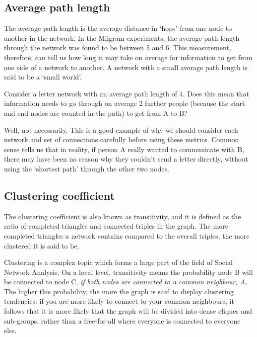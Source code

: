 \documentclass[
]{book}
\begin{document}
\hypertarget{average-path-length}{%
\subsection{Average path length}\label{average-path-length}}

The average path length is the average distance in `hops' from one node to another in the network. In the Milgram experiments, the average path length through the network was found to be between 5 and 6. This measurement, therefore, can tell us how long it may take on average for information to get from one side of a network to another. A network with a small average path length is said to be a `small world'.

Consider a letter network with an average path length of 4. Does this mean that information needs to go through on average 2 further people (because the start and end nodes are counted in the path) to get from A to B?

Well, not necessarily. This is a good example of why we should consider each network and set of connections carefully before using these metrics. Common sense tells us that in reality, if person A really wanted to communicate with B, there may have been no reason why they couldn't send a letter directly, without using the `shortest path' through the other two nodes.

\hypertarget{clustering-coefficient}{%
\subsection{Clustering coefficient}\label{clustering-coefficient}}

The clustering coefficient is also known as transitivity, and it is defined as the ratio of completed triangles and connected triples in the graph. The more completed triangles a network contains compared to the overall triples, the more clustered it is said to be.

Clustering is a complex topic which forms a large part of the field of Social Network Analysis. On a local level, transitivity means the probability node B will be connected to node C, \emph{if both nodes are connected to a common neighbour, A.} The higher this probability, the more the graph is said to display clustering tendencies: if you are more likely to connect to your common neighbours, it follows that it is more likely that the graph will be divided into dense cliques and sub-groups, rather than a free-for-all where everyone is connected to everyone else.
\end{document}
